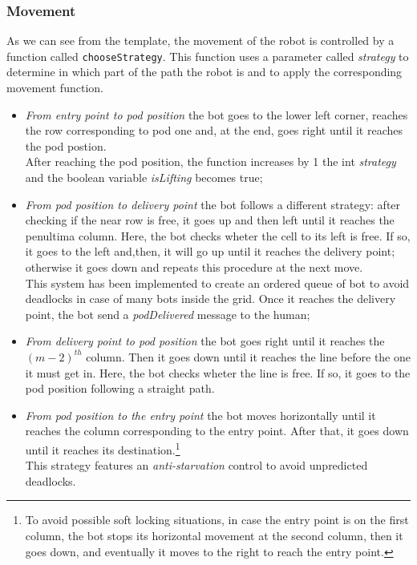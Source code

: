 \documentclass{article}
\begin{document}
			\subsubsection{Movement}
				As we can see from the template, the movement of the robot is controlled by a function called \verb|chooseStrategy|. This function uses a parameter called \emph{strategy} to determine in which part of the path the robot is and to apply the corresponding movement function.\\
				\begin{itemize}
					\item \emph{From entry point to pod position} the bot goes to the lower left corner, reaches the row corresponding to pod one and, at the end, goes right until it reaches the pod postion.\\After reaching the pod position, the function increases by 1 the int \emph{strategy} and the boolean variable \emph{isLifting} becomes true;
					\item \emph{From pod position to delivery point} the bot follows a different strategy: after checking if the near row is free, it goes up and then left until it reaches the penultima column. Here, the bot checks wheter the cell to its left is free. If so, it goes to the left and,then, it will go up until it reaches the delivery point; otherwise it goes down and repeats this procedure at the next move.\\This system has been implemented to create an ordered queue of bot to avoid deadlocks in case of many bots inside the grid. Once it reaches the delivery point, the bot send a \emph{podDelivered} message to the human;
					\item \emph{From delivery point to pod position} the bot goes right until it reaches the ${(m-2)}^{th}$ column. Then it goes down until it reaches the line before the one it must get in. Here, the bot checks wheter the line is free. If so, it goes to the pod position following a straight path.
					\item \emph{From pod position to the entry point} the bot moves horizontally until it reaches the column corresponding to the entry point. After that, it goes down until it reaches its destination.\footnote{To avoid possible soft locking situations, in case the entry point is on the first column, the bot stops its horizontal movement at the second column, then it goes down, and eventually it moves to the right to reach the entry point.}\\This strategy features an \emph{anti-starvation} control to avoid unpredicted deadlocks.
				\end{itemize}
				
\end{document}
